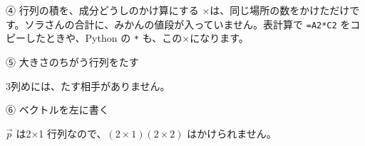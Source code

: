 \begin{tsumazuki}{④ 行列の積を、成分どうしのかけ算にする}
×は、同じ場所の数をかけただけです。ソラさんの合計に、みかんの値段が入っていません。表計算で \texttt{=A2*C2} をコピーしたときや、Python の \texttt{*} も、この×になります。
\end{tsumazuki}

\noindent\begin{minipage}[t]{0.485\linewidth}\vspace{0pt}
\begin{tsumazuki}{⑤ 大きさのちがう行列をたす}
\raggedright{}
3列めには、たす相手がありません。
\end{tsumazuki}
\end{minipage}\hfill
\begin{minipage}[t]{0.485\linewidth}\vspace{0pt}
\begin{tsumazuki}{⑥ ベクトルを左に書く}
\raggedright{}
$\vec p$ は2×1 行列なので、$(2\times1)(2\times2)$ はかけられません。
\end{tsumazuki}
\end{minipage}


